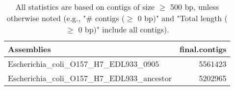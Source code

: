 \documentclass[12pt,a4paper]{article}
\begin{document}
\begin{table}[ht]
\begin{center}
\caption{All statistics are based on contigs of size $\geq$ 500 bp, unless otherwise noted (e.g., "\# contigs ($\geq$ 0 bp)" and "Total length ($\geq$ 0 bp)" include all contigs).}
\begin{tabular}{|l*{1}{|r}|}
\hline
Assemblies & final.contigs \\ \hline
Escherichia\_coli\_O157\_H7\_EDL933\_0905 & 5561423 \\ \hline
Escherichia\_coli\_O157\_H7\_EDL933\_ancestor & 5202965 \\ \hline
\end{tabular}
\end{center}
\end{table}
\end{document}
